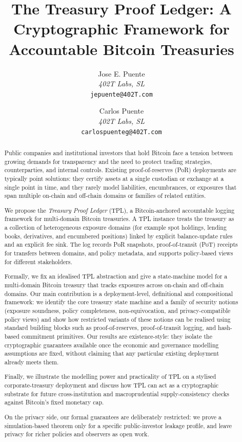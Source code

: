 \documentclass[11pt]{article}
\title{The Treasury Proof Ledger: A Cryptographic Framework for Accountable Bitcoin Treasuries}
\author{
\begin{tabular}[t]{@{}c@{}}
Jose E. Puente\\
\textit{402T Labs, SL}\\
\texttt{jepuente@402T.com}
\end{tabular}
\and
\begin{tabular}[t]{@{}c@{}}
Carlos Puente\\
\textit{402T Labs, SL}\\
\texttt{carlospuenteg@402T.com}
\end{tabular}
}
\date{}
\begin{document}
\maketitle

\begin{abstract}

Public companies and institutional investors that hold Bitcoin face a tension between growing demands for transparency and the need to protect trading strategies, counterparties, and internal controls. Existing proof-of-reserves (PoR) deployments are typically point solutions: they certify assets at a single custodian or exchange at a single point in time, and they rarely model liabilities, encumbrances, or exposures that span multiple on-chain and off-chain domains or families of related entities.

We propose the \emph{Treasury Proof Ledger} (TPL), a Bitcoin-anchored accountable logging framework for multi-domain Bitcoin treasuries. A TPL instance treats the treasury as a collection of heterogeneous exposure domains (for example spot holdings, lending books, derivatives, and encumbered positions) linked by explicit balance-update rules and an explicit fee sink. The log records PoR snapshots, proof-of-transit (PoT) receipts for transfers between domains, and policy metadata, and supports policy-based views for different stakeholders.

Formally, we fix an idealised TPL abstraction and give a state-machine model for a multi-domain Bitcoin treasury that tracks
exposures across on-chain and off-chain domains. Our main contribution is a deployment-level, definitional and compositional
framework: we identify the core treasury state machine and a family of security notions (exposure soundness, policy completeness,
non-equivocation, and privacy-compatible policy views) and show how restricted variants of these notions can be realised using
standard building blocks such as proof-of-reserves, proof-of-transit logging, and hash-based commitment primitives. Our results
are existence-style: they isolate the cryptographic guarantees available once the economic and governance modelling assumptions
are fixed, without claiming that any particular existing deployment already meets them.

Finally, we illustrate the modelling power and practicality of TPL on a stylised corporate-treasury deployment and discuss how TPL can act as a cryptographic substrate for future cross-institution and macroprudential supply-consistency checks against Bitcoin's fixed monetary cap.

On the privacy side, our formal guarantees are deliberately restricted: we prove a simulation-based theorem only for a specific public-investor leakage profile, and leave privacy for richer policies and observers as open work.
\end{abstract}
\end{document}
